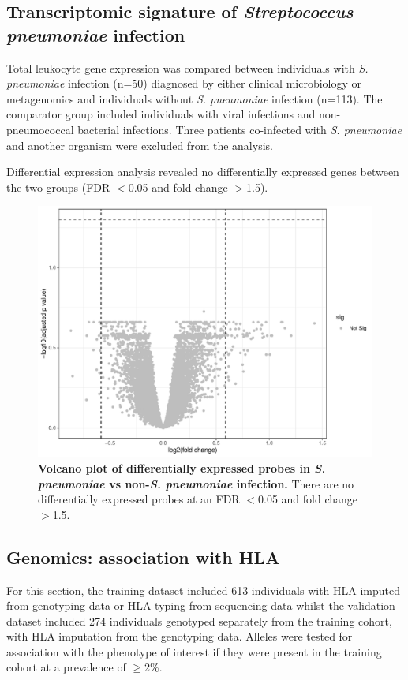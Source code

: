\subsection{Transcriptomic signature of \textit{Streptococcus pneumoniae} infection}
Total leukocyte gene expression was compared between individuals with \textit{S. pneumoniae} infection (n=50) diagnosed by either clinical microbiology or metagenomics and individuals without \textit{S. pneumoniae} infection (n=113). The comparator group included individuals with viral infections and non-pneumococcal bacterial infections. Three patients co-infected with \textit{S. pneumoniae} and another organism were excluded from the analysis.

Differential expression analysis revealed no differentially expressed genes between the two groups (FDR $<$0.05 and fold change $>$1.5).

\FloatBarrier
\begin{figure}[htbp]
\centering
\includegraphics[width=\textwidth]{./Results3/Images/vp-strep.pdf}
\caption[Volcano plot of differentially expressed probes in \textit{S. pneumoniae} infection]{\textbf{Volcano plot of differentially expressed probes in \textit{S. pneumoniae} vs non-\textit{S. pneumoniae} infection.} There are no differentially expressed probes at an FDR $<$0.05 and fold change $>$1.5.}
\label{fig:vp-viral-bacterial}
\end{figure}
\FloatBarrier


\subsection{Genomics: association with HLA}
For this section, the training dataset included 613 individuals with HLA imputed from genotyping data or HLA typing from sequencing data whilst the validation dataset included 274 individuals genotyped separately from the training cohort, with HLA imputation from the genotyping data. Alleles were tested for association with the phenotype of interest if they were present in the training cohort at a prevalence of $\geq$2\%.

